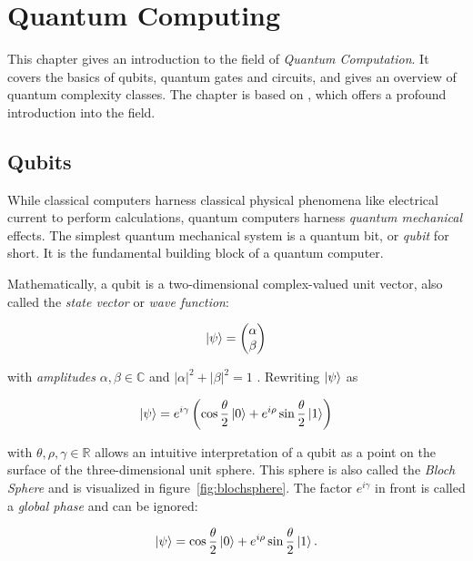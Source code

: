 \chapter{Quantum Computing}
\label{sec:quantum_computing}

This chapter gives an introduction to the field of \textit{Quantum Computation}. It covers the basics of qubits, quantum gates and circuits, and gives an overview of quantum complexity classes. The chapter is based on \cite{nielsen2002quantum}, which offers a profound introduction into the field.

\section{Qubits}

While classical computers harness classical physical phenomena like electrical current to perform calculations, quantum computers harness 
\textit{quantum mechanical} effects. The simplest quantum mechanical system is a quantum bit, or
\textit{qubit} for short. It is the fundamental building block of a quantum computer.

Mathematically, a qubit is a two-dimensional complex-valued unit vector,
also called the \textit{state vector} or \textit{wave function}:

\begin{equation}
  \label{eq:qubit1}
  \Ket{\psi} = \begin{pmatrix} \alpha \\ \beta \end{pmatrix}
\end{equation}

with \textit{amplitudes} $\alpha, \beta \in \mathbb{C}$ and $|\alpha|^2 + |\beta| ^2 = 1$ . 
Rewriting $\Ket{\psi}$ as

\begin{equation}
  \Ket{\psi} = e^{i \gamma} \left( \cos{\frac{\theta}{2}} \Ket{0} + e^{i \rho} \sin{\frac{\theta}{2}} \Ket{1} \right)
\end{equation}

with $\theta, \rho, \gamma \in \mathbb{R}$
allows an intuitive interpretation of a qubit as a point on the surface of the three-dimensional unit sphere.
This sphere is also called the \textit{Bloch Sphere} and is visualized in figure~\ref{fig:blochsphere}. The factor $e^{i \gamma}$ in front is called a
\textit{global phase} and can be ignored:

\begin{equation}
  \Ket{\psi} = \cos{\frac{\theta}{2}} \Ket{0} + e^{i \rho} \sin{\frac{\theta}{2}} \Ket{1}.
\end{equation}

